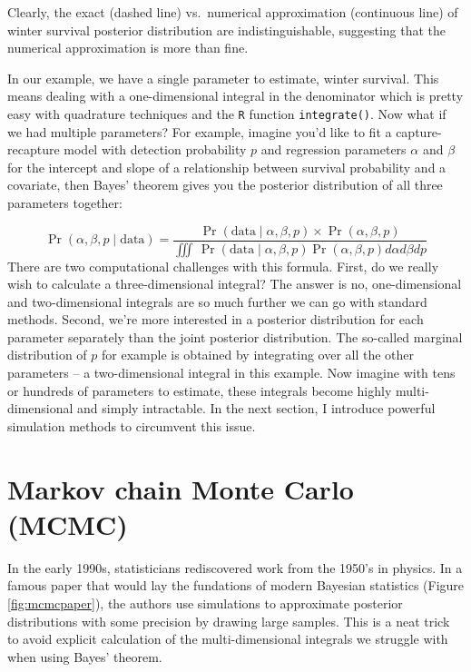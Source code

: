 \documentclass[
  12pt,
]{krantz}
\begin{document}
Clearly, the exact (dashed line) vs.~numerical approximation (continuous line) of winter survival posterior distribution are indistinguishable, suggesting that the numerical approximation is more than fine.

In our example, we have a single parameter to estimate, winter survival. This means dealing with a one-dimensional integral in the denominator which is pretty easy with quadrature techniques and the \texttt{R} function \texttt{integrate()}. Now what if we had multiple parameters? For example, imagine you'd like to fit a capture-recapture model with detection probability \(p\) and regression parameters \(\alpha\) and \(\beta\) for the intercept and slope of a relationship between survival probability and a covariate, then Bayes' theorem gives you the posterior distribution of all three parameters together:

\[ \Pr(\alpha, \beta, p \mid \text{data}) = \frac{ \Pr(\text{data} \mid \alpha, \beta, p) \times \Pr(\alpha, \beta, p)}{\iiint \, \Pr(\text{data} \mid \alpha, \beta, p) \Pr(\alpha, \beta, p) d\alpha d\beta dp} \]
There are two computational challenges with this formula. First, do we really wish to calculate a three-dimensional integral? The answer is no, one-dimensional and two-dimensional integrals are so much further we can go with standard methods. Second, we're more interested in a posterior distribution for each parameter separately than the joint posterior distribution. The so-called marginal distribution of \(p\) for example is obtained by integrating over all the other parameters -- a two-dimensional integral in this example. Now imagine with tens or hundreds of parameters to estimate, these integrals become highly multi-dimensional and simply intractable. In the next section, I introduce powerful simulation methods to circumvent this issue.

\section{Markov chain Monte Carlo (MCMC)}\label{markov-chain-monte-carlo-mcmc}

In the early 1990s, statisticians rediscovered work from the 1950's in physics. In a famous paper that would lay the fundations of modern Bayesian statistics (Figure \ref{fig:mcmcpaper}), the authors use simulations to approximate posterior distributions with some precision by drawing large samples. This is a neat trick to avoid explicit calculation of the multi-dimensional integrals we struggle with when using Bayes' theorem.
\end{document}
